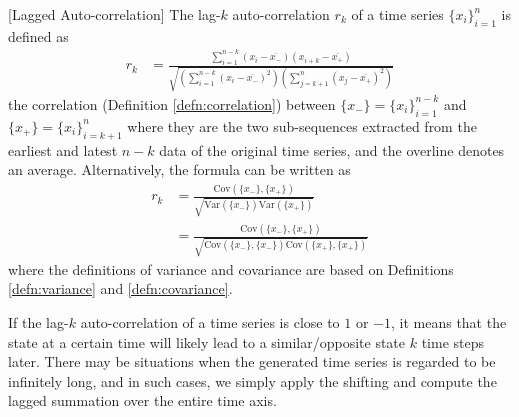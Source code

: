 \begin{defn}
\label{defn:autocorr}[Lagged Auto-correlation]
The lag-$k$ auto-correlation $r_k$ of a time series $\{x_i\}_{i=1}^{n}$ is defined as 
\begin{align}
r_k &= \frac{\sum_{i=1}^{n-k}(x_i - \overline{x_{-}})(x_{i+k} - \overline{x_{+}})}{\sqrt{(\sum_{i=1}^{n-k}(x_i - \overline{x_{-}})^2) (\sum_{j=k+1}^{n}(x_j - \overline{x_{+}})^2)}}
\end{align}
the correlation (Definition \ref{defn:correlation}) between $\{x_{-}\} = \{x_i\}_{i=1}^{n-k}$ and $\{x_{+}\} = \{x_i\}_{i=k+1}^{n}$ where they are the two sub-sequences extracted from the earliest and latest $n-k$ data of the original time series, and the overline denotes an average. Alternatively, the formula can be written as
\begin{subequations}
\label{eqn:autocorrvar}
\begin{align}
r_k &= \frac{\text{Cov}(\{x_{-}\},\{x_{+}\})}{\sqrt{\text{Var}(\{x_{-}\}) \text{Var}(\{x_{+}\})}} \\
&= \frac{\text{Cov}(\{x_{-}\},\{x_{+}\})}{\sqrt{\text{Cov}(\{x_{-}\}, \{x_{-}\}) \text{Cov}(\{x_{+}\}, \{x_{+}\})}}
\end{align}   
\end{subequations}
where the definitions of variance and covariance are based on Definitions \ref{defn:variance} and \ref{defn:covariance}.
\end{defn}
If the lag-$k$ auto-correlation of a time series is close to $1$ or $-1$, it means that the state at a certain time will likely lead to a similar/opposite state $k$ time steps later. There may be situations when the generated time series is regarded to be infinitely long, and in such cases, we simply apply the shifting and compute the lagged summation over the entire time axis.

